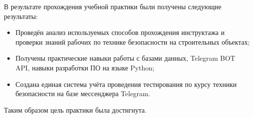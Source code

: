 \conclusion

В результате прохождения учебной практики были получены следующие результаты:
\begin{itemize}
\item Проведён анализ используемых способов прохождения инструктажа и проверки знаний рабочих по технике безопасности на строительных объектах;
\item Получены практические навыки работы с базами данных, Telegram BOT API, навыки разработки ПО на языке Python;
\item Создана единая система учёта проведения тестирования по курсу техники безопасности на базе мессенджера Telegram.
\end{itemize}

Таким образом цель практики была достигнута.